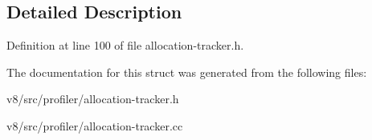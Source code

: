 \subsection{Detailed Description}


Definition at line 100 of file allocation-\/tracker.\+h.



The documentation for this struct was generated from the following files\+:\begin{DoxyCompactItemize}
\item 
v8/src/profiler/allocation-\/tracker.\+h\item 
v8/src/profiler/allocation-\/tracker.\+cc\end{DoxyCompactItemize}
